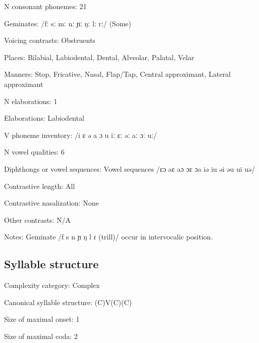 {\begin{appendixdesc}
\item[N consonant phonemes:] 21

\item[Geminates:] /fː sː mː nː ɲː ŋː lː rː/ (Some)

\item[Voicing contrasts:] Obstruents

\item[Places:] Bilabial, Labiodental, Dental, Alveolar, Palatal, Velar

\item[Manners:] Stop, Fricative, Nasal, Flap/Tap, Central approximant, Lateral approximant

\item[N elaborations:] 1

\item[Elaborations:] Labiodental

\item[V phoneme inventory:] /i ɛ ə a ɔ u iː ɛː əː aː ɔː uː/

\item[N vowel qualities:] 6

\item[Diphthongs or vowel sequences:] Vowel sequences /ɛɔ aɛ aɔ ɔɛ ɔa iə iu əi əu ui uə/

\item[Contrastive length:] All

\item[Contrastive nasalization:] None

\item[Other contrasts:] N/A

\item[Notes:] Geminate /f s n ɲ ŋ l ɾ (trill)/ occur in intervocalic position.
\end{appendixdesc}
\subsection*{Syllable structure}
\begin{appendixdesc}

\item[Complexity category:] Complex

\item[Canonical syllable structure:] (C)V(C)(C) \citep[36--43]{Stirtz2011}

\item[Size of maximal onset:] 1

\item[Size of maximal coda:] 2


\end{appendixdesc}}
